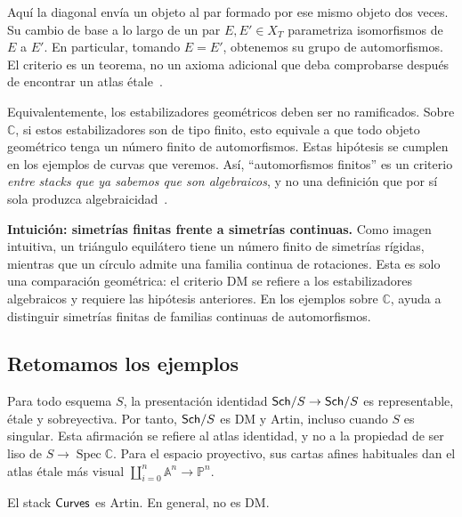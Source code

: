 \documentclass[12pt,openany]{memoir}
\begin{document}
Aquí la diagonal envía un objeto al par formado por ese mismo objeto dos
veces. Su cambio de base a lo largo de un par \(E,E'\in X_T\)
parametriza isomorfismos de \(E\) a \(E'\). En particular, tomando
\(E=E'\), obtenemos su grupo de automorfismos. El criterio es un teorema,
no un axioma adicional que deba comprobarse después de encontrar un atlas
étale~\cite{sp:dm}.

Equivalentemente, los estabilizadores geométricos deben ser no
ramificados. Sobre \(\mathbb C\), si estos estabilizadores son de tipo
finito, esto equivale a que todo objeto geométrico tenga un número finito
de automorfismos. Estas hipótesis se cumplen en los ejemplos de curvas
que veremos. Así, ``automorfismos finitos'' es un criterio \emph{entre
stacks que ya sabemos que son algebraicos}, y no una definición que por
sí sola produzca algebraicidad~\cite{sp:dm-locus,sp:curve-aut}.

\begin{ptcb}
\textbf{Intuición: simetrías finitas frente a simetrías continuas.}
Como imagen intuitiva, un triángulo equilátero tiene un número finito de
simetrías rígidas, mientras que un círculo admite una familia continua
de rotaciones. Esta es solo una comparación geométrica: el criterio DM
se refiere a los estabilizadores algebraicos y requiere las hipótesis
anteriores. En los ejemplos sobre \(\mathbb C\), ayuda a distinguir
simetrías finitas de familias continuas de automorfismos.
\end{ptcb}

\subsection{Retomamos los ejemplos}

\begin{Ex}
Para todo esquema \(S\), la presentación identidad
\(\mathsf{Sch}/S\to\mathsf{Sch}/S\) es representable, étale y sobreyectiva.
Por tanto, \(\mathsf{Sch}/S\) es DM y Artin, incluso cuando \(S\) es singular.
Esta afirmación se refiere al atlas identidad, y no a la propiedad de ser liso de
\(S\to\operatorname{Spec}\mathbb C\).
Para el espacio proyectivo, sus cartas afines habituales dan el atlas
étale más visual \(\coprod_{i=0}^n\mathbb A^n\to\mathbb P^n\).
\end{Ex}

\begin{Th}
El stack \(\mathsf{Curves}\) es Artin. En general, no es DM.
\end{Th}
\end{document}
